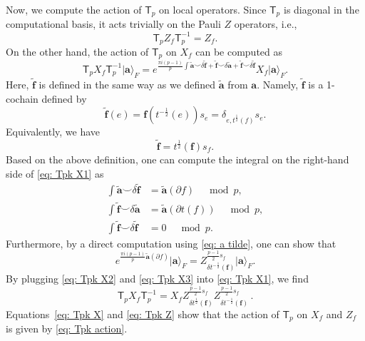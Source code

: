 \documentclass[aps,twocolumn,prx,floatfix,preprintnumbers, nofootinbib,10pt]{revtex4-2}
\numberwithin{equation}{section}
\theoremstyle{definition}
\theoremstyle{remark}
\theoremstyle{claim}
\def\ket#1{{|{#1}\rangle}}
\renewcommand{\sf}[1]{\mathsf{#1}}
\begin{document}
\vspace*{\baselineskip}
Now, we compute the action of $\sf{T}_p$ on local operators.
Since $\sf{T}_p$ is diagonal in the computational basis, it acts trivially on the Pauli $Z$ operators, i.e., 
\begin{equation}
\sf{T}_p Z_f \sf{T}_p^{-1} = Z_f.
\label{eq: Tpk Z}
\end{equation}
On the other hand, the action of $\sf{T}_p$ on $X_f$ can be computed as
\begin{equation}
\sf{T}_p X_f \sf{T}_p^{-1} \ket{\bm{a}}_F = e^{\frac{\pi i (p - 1)}{p} \int \tilde{\bm{a}} \smile \delta \tilde{\bm{f}} + \tilde{\bm{f}} \smile \delta \tilde{\bm{a}} + \tilde{\bm{f}} \smile \delta \tilde{\bm{f}}} X_f \ket{\bm{a}}_F.
\label{eq: Tpk X1}
\end{equation}
Here, $\tilde{\bm{f}}$ is defined in the same way as we defined $\tilde{\bm{a}}$ from $\bm{a}$.
Namely, $\tilde{\bm{f}}$ is a 1-cochain defined by
\begin{equation}
\tilde{\bm{f}}(e) = \bm{f}(t^{-\frac{1}{2}}(e)) s_e = \delta_{e, t^{\frac{1}{2}}(f)} s_e.
\end{equation}
Equivalently, we have
\begin{equation}
\tilde{\bm{f}} = t^{\frac{1}{2}}(\bm{f}) s_f.
\end{equation}
Based on the above definition, one can compute the integral on the right-hand side of \eqref{eq: Tpk X1} as
\begin{equation}
\begin{aligned}
\int \tilde{\bm{a}} \smile \delta \tilde{\bm{f}} &= \tilde{\bm{a}}(\partial f) \quad \bmod p, \\
\int \tilde{\bm{f}} \smile \delta \tilde{\bm{a}} &= \tilde{\bm{a}}(\partial t(f)) \quad \bmod p, \\
\int \tilde{\bm{f}} \smile \delta \tilde{\bm{f}} &= 0 \quad \bmod p.
\end{aligned}
\label{eq: Tpk X2}
\end{equation}
Furthermore, by a direct computation using \eqref{eq: a tilde}, one can show that
\begin{equation}
e^{\frac{\pi i (p-1)}{p} \tilde{\bm{a}}(\partial f)} \ket{\bm{a}}_F = Z_{\delta t^{-\frac{1}{2}}(\bm{f})}^{ \frac{p - 1}{2} s_f} \ket{\bm{a}}_F.
\label{eq: Tpk X3}
\end{equation}
By plugging \eqref{eq: Tpk X2} and \eqref{eq: Tpk X3} into \eqref{eq: Tpk X1}, we find
\begin{equation}
\sf{T}_p X_f \sf{T}_p^{-1} = X_f Z_{\delta t^{\frac{1}{2}}(\bm{f})}^{ \frac{p - 1}{2} s_f} Z_{\delta t^{-\frac{1}{2}}(\bm{f})}^{ \frac{p - 1}{2} s_f} \,.
\label{eq: Tpk X}
\end{equation}
Equations~\eqref{eq: Tpk X} and \eqref{eq: Tpk Z} show that the action of $\sf{T}_p$ on $X_f$ and $Z_f$ is given by \eqref{eq: Tpk action}.
\end{document}
